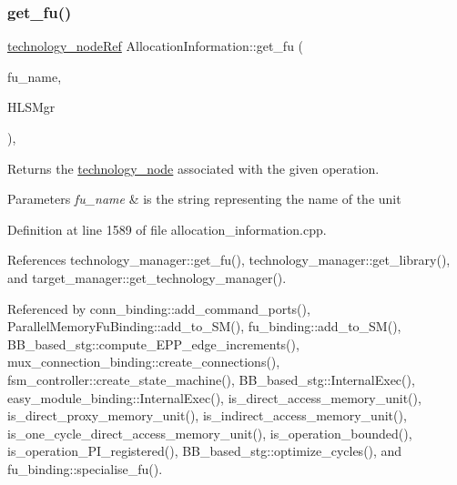 \subsubsection{\texorpdfstring{get\+\_\+fu()}{get\_fu()}\hspace{0.1cm}{\footnotesize\ttfamily [1/2]}}
{\footnotesize\ttfamily \hyperlink{technology__node_8hpp_a33dd193b7bd6b987bf0d8a770a819fa7}{technology\+\_\+node\+Ref} Allocation\+Information\+::get\+\_\+fu (\begin{DoxyParamCaption}\item[{const std\+::string \&}]{fu\+\_\+name,  }\item[{const \hyperlink{hls__manager_8hpp_a1b481383e3beabc89bd7562ae672dd8c}{H\+L\+S\+\_\+manager\+Const\+Ref}}]{H\+L\+S\+Mgr }\end{DoxyParamCaption})\hspace{0.3cm}{\ttfamily [static]}, {\ttfamily [private]}}



Returns the \hyperlink{structtechnology__node}{technology\+\_\+node} associated with the given operation. 


\begin{DoxyParams}{Parameters}
{\em fu\+\_\+name} & is the string representing the name of the unit \\
\hline
\end{DoxyParams}


Definition at line 1589 of file allocation\+\_\+information.\+cpp.



References technology\+\_\+manager\+::get\+\_\+fu(), technology\+\_\+manager\+::get\+\_\+library(), and target\+\_\+manager\+::get\+\_\+technology\+\_\+manager().



Referenced by conn\+\_\+binding\+::add\+\_\+command\+\_\+ports(), Parallel\+Memory\+Fu\+Binding\+::add\+\_\+to\+\_\+\+S\+M(), fu\+\_\+binding\+::add\+\_\+to\+\_\+\+S\+M(), B\+B\+\_\+based\+\_\+stg\+::compute\+\_\+\+E\+P\+P\+\_\+edge\+\_\+increments(), mux\+\_\+connection\+\_\+binding\+::create\+\_\+connections(), fsm\+\_\+controller\+::create\+\_\+state\+\_\+machine(), B\+B\+\_\+based\+\_\+stg\+::\+Internal\+Exec(), easy\+\_\+module\+\_\+binding\+::\+Internal\+Exec(), is\+\_\+direct\+\_\+access\+\_\+memory\+\_\+unit(), is\+\_\+direct\+\_\+proxy\+\_\+memory\+\_\+unit(), is\+\_\+indirect\+\_\+access\+\_\+memory\+\_\+unit(), is\+\_\+one\+\_\+cycle\+\_\+direct\+\_\+access\+\_\+memory\+\_\+unit(), is\+\_\+operation\+\_\+bounded(), is\+\_\+operation\+\_\+\+P\+I\+\_\+registered(), B\+B\+\_\+based\+\_\+stg\+::optimize\+\_\+cycles(), and fu\+\_\+binding\+::specialise\+\_\+fu().

